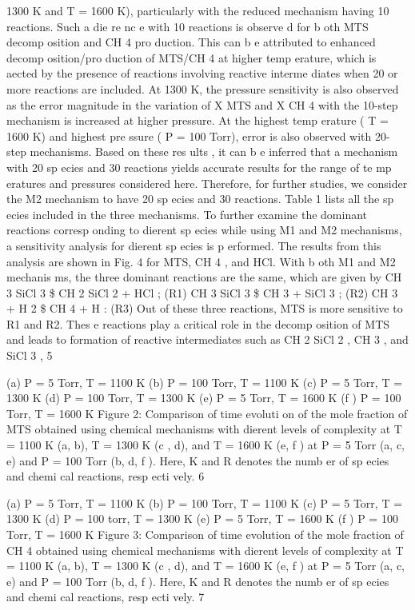\documentclass[10pt, letterpaper]{article}
\begin{document}
1300 K and T = 1600 K), particularly with the reduced mechanism having 10 reactions. Such a die re nc e
with 10 reactions is observe d for b oth MTS decomp osition and CH
4
pro duction. This can b e attributed to
enhanced decomp osition/pro duction of MTS/CH
4
at higher temp erature, which is aected by the presence of
reactions involving reactive interme diates when 20 or more reactions are included. At 1300 K, the pressure
sensitivity is also observed as the error magnitude in the variation of
X
MTS
and
X
CH
4
with the 10-step
mechanism is increased at higher pressure. At the highest temp erature (
T
= 1600 K) and highest pre ssure
(
P
= 100 Torr), error is also observed with 20-step mechanisms. Based on these res ults , it can b e inferred
that a mechanism with 20 sp ecies and 30 reactions yields accurate results for the range of te mp eratures and
pressures considered here. Therefore, for further studies, we consider the M2 mechanism to have 20 sp ecies
and 30 reactions. Table 1 lists all the sp ecies included in the three mechanisms.
To further examine the dominant reactions corresp onding to dierent sp ecies while using M1 and M2
mechanisms, a sensitivity analysis for dierent sp ecies is p erformed. The results from this analysis are shown
in Fig. 4 for MTS, CH
4
, and HCl. With b oth M1 and M2 mechanis ms, the three dominant reactions are the
same, which are given by
CH
3
SiCl
3
\$
CH
2
SiCl
2
+ HCl
;
(R1)
CH
3
SiCl
3
\$
CH
3
+ SiCl
3
;
(R2)
CH
3
+ H
2
\$
CH
4
+ H
:
(R3)
Out of these three reactions, MTS is more sensitive to R1 and R2. Thes e reactions play a critical role in the
decomp osition of MTS and leads to formation of reactive intermediates such as CH
2
SiCl
2
, CH
3
, and SiCl
3
,
5


(a)
P
= 5 Torr,
T
= 1100 K
(b)
P
= 100 Torr,
T
= 1100 K
(c)
P
= 5 Torr,
T
= 1300 K
(d)
P
= 100 Torr,
T
= 1300 K
(e)
P
= 5 Torr,
T
= 1600 K
(f )
P
= 100 Torr,
T
= 1600 K
Figure 2: Comparison of time evoluti on of the mole fraction of MTS obtained using chemical mechanisms with dierent levels
of complexity at T = 1100 K (a, b), T = 1300 K (c , d), and T = 1600 K (e, f ) at P = 5 Torr (a, c, e) and P = 100 Torr (b, d,
f ). Here, K and R denotes the numb er of sp ecies and chemi cal reactions, resp ecti vely.
6


(a)
P
= 5 Torr,
T
= 1100 K
(b)
P
= 100 Torr,
T
= 1100 K
(c)
P
= 5 Torr,
T
= 1300 K
(d)
P
= 100 torr,
T
= 1300 K
(e)
P
= 5 Torr,
T
= 1600 K
(f )
P
= 100 Torr,
T
= 1600 K
Figure 3: Comparison of time evolution of the mole fraction of CH
4
obtained using chemical mechanisms with dierent levels
of complexity at T = 1100 K (a, b), T = 1300 K (c , d), and T = 1600 K (e, f ) at P = 5 Torr (a, c, e) and P = 100 Torr (b, d,
f ). Here, K and R denotes the numb er of sp ecies and chemi cal reactions, resp ecti vely.
7
\end{document}
